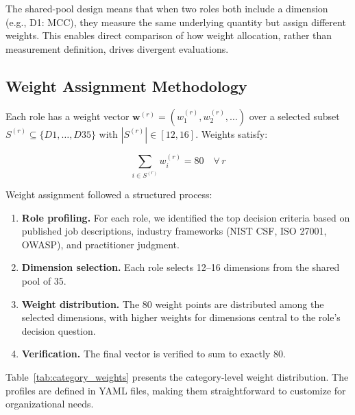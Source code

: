 \documentclass[10pt,twocolumn]{article}
\begin{document}
The shared-pool design means that when two roles both include a dimension (e.g., D1: MCC), they measure the same underlying quantity but assign different weights. This enables direct comparison of how weight allocation, rather than measurement definition, drives divergent evaluations.

\subsection{Weight Assignment Methodology}
\label{sec:weights}

Each role has a weight vector $\mathbf{w}^{(r)} = (w_1^{(r)}, w_2^{(r)}, \ldots)$ over a selected subset $S^{(r)} \subseteq \{D1, \ldots, D35\}$ with $|S^{(r)}| \in [12, 16]$. Weights satisfy:

\begin{equation}
\sum_{i \in S^{(r)}} w_i^{(r)} = 80 \quad \forall \, r
\label{eq:weight_constraint}
\end{equation}

Weight assignment followed a structured process:

\begin{enumerate}[noitemsep,topsep=2pt]
    \item \textbf{Role profiling.} For each role, we identified the top decision criteria based on published job descriptions, industry frameworks (NIST CSF, ISO 27001, OWASP), and practitioner judgment.
    \item \textbf{Dimension selection.} Each role selects 12--16 dimensions from the shared pool of 35.
    \item \textbf{Weight distribution.} The 80 weight points are distributed among the selected dimensions, with higher weights for dimensions central to the role's decision question.
    \item \textbf{Verification.} The final vector is verified to sum to exactly 80.
\end{enumerate}

Table~\ref{tab:category_weights} presents the category-level weight distribution. The profiles are defined in YAML files, making them straightforward to customize for organizational needs.
\end{document}
